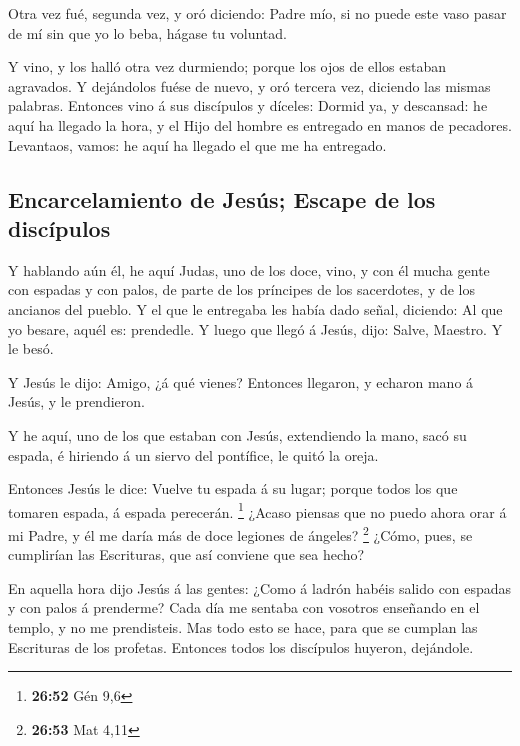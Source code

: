  Otra vez fué, segunda vez, y oró diciendo: Padre mío, si
no puede este vaso pasar de mí sin que yo lo beba, hágase tu voluntad.

 Y vino, y los halló otra vez durmiendo; porque los ojos
de ellos estaban agravados.  Y dejándolos fuése de nuevo,
y oró tercera vez, diciendo las mismas palabras. 
Entonces vino á sus discípulos y díceles: Dormid ya, y descansad: he
aquí ha llegado la hora, y el Hijo del hombre es entregado en manos de
pecadores.  Levantaos, vamos: he aquí ha llegado el que
me ha entregado.

\hypertarget{encarcelamiento-de-jesuxfas-escape-de-los-discuxedpulos}{%
\subsection{Encarcelamiento de Jesús; Escape de los
discípulos}\label{encarcelamiento-de-jesuxfas-escape-de-los-discuxedpulos}}

 Y hablando aún él, he aquí Judas, uno de los doce, vino,
y con él mucha gente con espadas y con palos, de parte de los príncipes
de los sacerdotes, y de los ancianos del pueblo.  Y el
que le entregaba les había dado señal, diciendo: Al que yo besare, aquél
es: prendedle.  Y luego que llegó á Jesús, dijo: Salve,
Maestro. Y le besó.

 Y Jesús le dijo: Amigo, ¿á qué vienes? Entonces
llegaron, y echaron mano á Jesús, y le prendieron.

 Y he aquí, uno de los que estaban con Jesús, extendiendo
la mano, sacó su espada, é hiriendo á un siervo del pontífice, le quitó
la oreja.

 Entonces Jesús le dice: Vuelve tu espada á su lugar;
porque todos los que tomaren espada, á espada perecerán. \footnote{\textbf{26:52}
  Gén 9,6}  ¿Acaso piensas que no puedo ahora orar á mi
Padre, y él me daría más de doce legiones de ángeles? \footnote{\textbf{26:53}
  Mat 4,11}  ¿Cómo, pues, se cumplirían las Escrituras,
que así conviene que sea hecho?

 En aquella hora dijo Jesús á las gentes: ¿Como á ladrón
habéis salido con espadas y con palos á prenderme? Cada día me sentaba
con vosotros enseñando en el templo, y no me prendisteis.
 Mas todo esto se hace, para que se cumplan las
Escrituras de los profetas. Entonces todos los discípulos huyeron,
dejándole.

